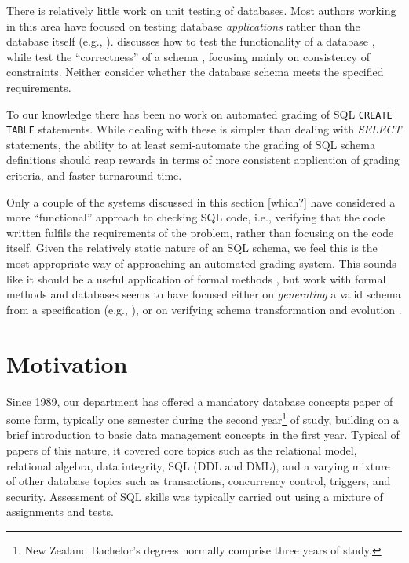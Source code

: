 \documentclass[sigconf, authordraft, capitalise]{acmart}
\begin{document}
There is relatively little work on unit testing of databases. Most authors working in this area have focused on testing database \emph{applications} rather than the database itself (e.g., \cite{Binnig.C-2008a-Multi-RQP,Chays.D-2008a-Query-based,Marcozzi.M-2012a-Test,Haller.K-2010a-Test}). \citeauthor{Ambler.S-2006a-Database} discusses how to test the functionality of a database \cite{Ambler.S-2006a-Database}, while \citeauthor{Farre.C-2008a-SVTe} test the ``correctness'' of a schema \cite{Farre.C-2008a-SVTe}, focusing mainly on consistency of constraints. Neither consider whether the database schema meets the specified requirements.

To our knowledge there has been no work on automated grading of SQL \texttt{CREATE TABLE} statements. While dealing with these is simpler than dealing with \emph{SELECT} statements, the ability to at least semi-automate the grading of SQL schema definitions should reap rewards in terms of more consistent application of grading criteria, and faster turnaround time.

Only a couple of the systems discussed in this section [which?] have considered a more ``functional'' approach to checking SQL code, i.e., verifying that the code written fulfils the requirements of the problem, rather than focusing on the code itself. Given the relatively static nature of an SQL schema, we feel this is the most appropriate way of approaching an automated grading system. This sounds like it should be a useful application of formal methods \cite{Spivey.J-1989a-An-introduction}, but work with formal methods and databases seems to have focused either on \emph{generating} a valid schema from a specification (e.g., \cite{Vatanawood.W-2004a-Formal,Lukovic.I-2003a-Proceedings,Choppella.V-2006a-Constructing}), or on verifying schema transformation and evolution \cite{Bench-Capon.T-1998a-Report}.


\section{Motivation}
\label{sec-motivation}

Since 1989, our department has offered a mandatory database concepts paper of some form, typically one semester during the second year\footnote{New Zealand Bachelor's degrees normally comprise three years of study.} of study, building on a brief introduction to basic data management concepts in the first year. Typical of papers of this nature, it covered core topics such as the relational model, relational algebra, data integrity, SQL (DDL and DML), and a varying mixture of other database topics such as transactions, concurrency control, triggers, and security. Assessment of SQL skills was typically carried out using a mixture of assignments and tests.
\end{document}
